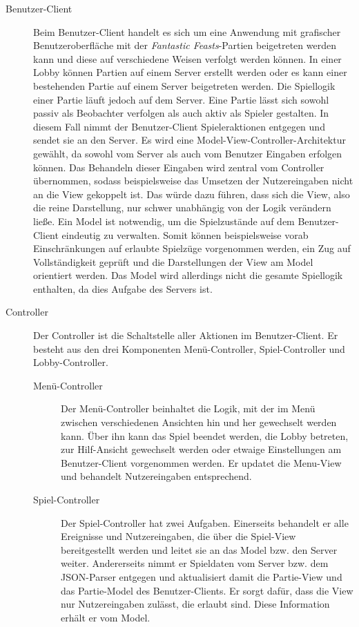     \begin{description}
        \item[Benutzer-Client]
        Beim Benutzer-Client handelt es sich um eine Anwendung mit grafischer Benutzeroberfläche mit der \textit{Fantastic Feasts}-Partien beigetreten werden kann und diese auf verschiedene Weisen verfolgt werden können. In einer Lobby können Partien auf einem Server erstellt werden oder es kann einer bestehenden Partie auf einem Server beigetreten werden. Die Spiellogik einer Partie läuft jedoch auf dem Server. Eine Partie lässt sich sowohl passiv als Beobachter verfolgen als auch aktiv als Spieler gestalten. In diesem Fall nimmt der Benutzer-Client Spieleraktionen entgegen und sendet sie an den Server.
        Es wird eine Model-View-Controller-Architektur gewählt, da sowohl vom Server als auch vom Benutzer Eingaben erfolgen können. Das Behandeln dieser Eingaben wird zentral vom Controller übernommen, sodass beispielsweise das Umsetzen der Nutzereingaben nicht an die View gekoppelt ist. Das würde dazu führen, dass sich die View, also die reine Darstellung, nur schwer unabhängig von der Logik verändern ließe. Ein Model ist notwendig, um die Spielzustände auf dem Benutzer-Client eindeutig zu verwalten. Somit können beispielsweise vorab Einschränkungen auf erlaubte Spielzüge vorgenommen werden, ein Zug auf Vollständigkeit geprüft und die Darstellungen der View am Model orientiert werden. Das Model wird allerdings nicht die gesamte Spiellogik enthalten, da dies Aufgabe des Servers ist.
        
        \item[Controller]
        Der Controller ist die Schaltstelle aller Aktionen im Benutzer-Client. Er besteht aus den drei Komponenten Menü-Controller, Spiel-Controller und Lobby-Controller.		
        
        \begin{description}
            \item[Menü-Controller]
            Der Menü-Controller beinhaltet die Logik, mit der im Menü zwischen verschiedenen Ansichten hin und her gewechselt werden kann. Über ihn kann das Spiel beendet werden, die Lobby betreten, zur Hilf-Ansicht gewechselt werden oder etwaige Einstellungen am Benutzer-Client vorgenommen werden. Er updatet die Menu-View und behandelt Nutzereingaben entsprechend. 
            
            \item[Spiel-Controller]
            Der Spiel-Controller hat zwei Aufgaben. Einerseits behandelt er alle Ereignisse und Nutzereingaben, die über die Spiel-View bereitgestellt werden und leitet sie an das Model bzw. den Server weiter. Andererseits nimmt er Spieldaten vom Server bzw. dem JSON-Parser entgegen und aktualisiert damit die Partie-View und das Partie-Model des Benutzer-Clients. Er sorgt dafür, dass die View nur Nutzereingaben zulässt, die erlaubt sind. Diese Information erhält er vom Model.
            

\end{description}
\end{description}
